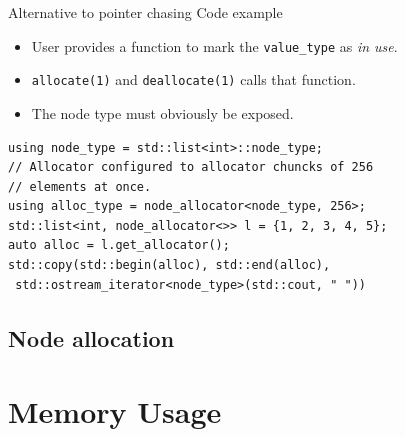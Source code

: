 \documentclass[10pt,aspectratio=169]{beamer}
\def\dgfile{\node[style=dgfile]}
\begin{document}
\begin{frame}[fragile]{Alternative to pointer chasing}
Code example
\begin{itemize}
\item User provides a function to mark the \texttt{value\_type}
as {\it in use}.
\item \texttt{allocate(1)} and \texttt{deallocate(1)} calls that 
function.
\item The node type must obviously be exposed.
\end{itemize}

\begin{lstlisting}
using node_type = std::list<int>::node_type;
// Allocator configured to allocator chuncks of 256
// elements at once.
using alloc_type = node_allocator<node_type, 256>;
std::list<int, node_allocator<>> l = {1, 2, 3, 4, 5};
auto alloc = l.get_allocator();
std::copy(std::begin(alloc), std::end(alloc),
 std::ostream_iterator<node_type>(std::cout, " "))
\end{lstlisting}

\end{frame}


\subsection[Node allocation]{Node allocation}
%
%
%

\section[Memory Usage]{Memory Usage}
\end{document}
